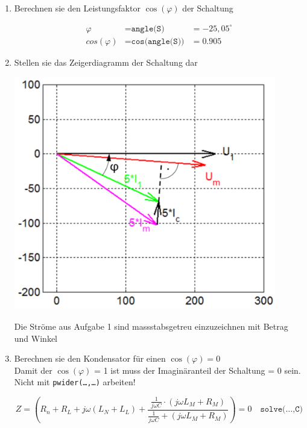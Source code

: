 \begin{enumerate}
\item Berechnen sie den Leistungsfaktor $\cos (\varphi)$ der Schaltung

\begin{minipage}{0.5\textwidth}
\begin{align*}
	\varphi &= \texttt{angle(S)} &= -25,05^\circ\\
	cos(\varphi) &= \texttt{cos(angle(S))} &= 0.905
\end{align*}
\end{minipage}

\item Stellen sie das Zeigerdiagramm der Schaltung dar

\begin{minipage}{0.5\textwidth}
\includegraphics[width=0.9\textwidth]{bilder/a42.png}
\end{minipage}
\begin{minipage}{0.45\textwidth}
Die Ströme aus Aufgabe 1 sind massstabsgetreu einzuzeichnen mit Betrag und Winkel
\end{minipage}

\item Berechnen sie den Kondensator für einen $\cos(\varphi) = 0$\\
Damit der $\cos(\varphi)$ = 1 ist muss der Imaginäranteil der Schaltung = 0 sein. Nicht mit \texttt{pwider(\ldots,\ldots)} arbeiten!

\[
	Z = \left( R_n+R_L + j\omega (L_N+L_L) +\frac{\frac{1}{j\omega C}\cdot (j\omega L_M+R_M)}{\frac{1}{j\omega C}+ (j\omega L_M+R_M)}\right)=0 \quad \texttt{solve(\ldots,C)}
\]

\end{enumerate}
